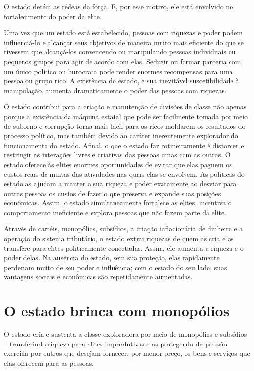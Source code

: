 O estado detém as rédeas da força. E, por esse motivo, ele está envolvido no fortalecimento do poder da elite. 

Uma vez que um estado está estabelecido, pessoas com riquezas e poder podem influenciá-lo e alcançar seus objetivos de maneira muito mais eficiente do que se tivessem que alcançá-los convencendo ou manipulando pessoas individuais ou pequenos grupos para agir de acordo com elas. Seduzir ou formar parceria com um único político ou burocrata pode render enormes recompensas para uma pessoa ou grupo rico. A existência do estado, e sua inevitável suscetibilidade à manipulação, aumenta dramaticamente o poder das pessoas com riquezas.

O estado contribui para a criação e manutenção de divisões de classe não apenas porque a existência da máquina estatal que pode ser facilmente tomada por meio de suborno e corrupção torna mais fácil para os ricos moldarem os resultados do processo político, mas também devido ao caráter inerentemente explorador do funcionamento do estado. Afinal, o que o estado faz rotineiramente é distorcer e restringir as interações livres e criativas das pessoas umas com as outras. O estado oferece às elites enormes oportunidades de evitar que elas paguem os custos reais de muitas das atividades nas quais elas se envolvem. As políticas do estado as ajudam a manter a sua riqueza e poder exatamente ao desviar para outras pessoas os custos de fazer o que preserva e expande suas posições econômicas. Assim, o estado simultaneamente fortalece as elites, incentiva o comportamento ineficiente e explora pessoas que não fazem parte da elite.

Através de cartéis, monopólios, subsídios, a criação inflacionária de dinheiro e a operação do sistema tributário, o estado extrai riquezas de quem as cria e as transfere para elites politicamente conectadas. Assim, ele aumenta a riqueza e o poder delas. Na ausência do estado, sem sua proteção, elas rapidamente perderiam muito de seu poder e influência; com o estado do seu lado, suas vantagens sociais e econômicas são repetidamente aumentadas.

\section{O estado brinca com monopólios}

O estado cria e sustenta a classe exploradora por meio de monopólios e subsídios -- transferindo riqueza para elites improdutivas e as protegendo da pressão exercida por outros que desejam fornecer, por menor preço, os bens e serviços que elas oferecem para as pessoas.

